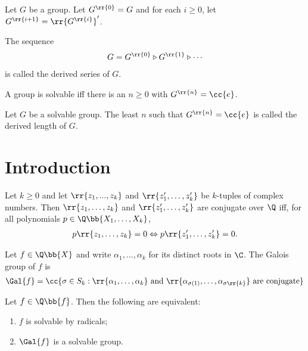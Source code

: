 \documentclass{article}
\begin{document}
\begin{definition}
  Let $G$ be a group. Let $G^{\rr{0}}=G$ and for each $i\geq 0$, let $G^{\rr{i+1}}=\rr{G^{\rr{i}}}'$.

  The sequence
  \begin{align*}
    G = G^{\rr{0}}\triangleright G^{\rr{1}}\triangleright \cdots
  \end{align*}
  is called the derived series of $G$.
\end{definition}

\begin{theorem}
  A group is solvable iff there is an $n\geq 0$ with $G^{\rr{n}}=\cc{e}$.
\end{theorem}

\begin{definition}
  Let $G$ be a solvable group. The least $n$ such that $G^{\rr{n}}=\cc{e}$ is called the
  derived length of $G$.
\end{definition}

\section{Introduction}\label{sec:introduction}

\begin{definition}
  Let $k\geq 0$ and let $\rr{z_1,...,z_k}$ and $\rr{z'_1,\ldots,z'_k}$ be $k$-tuples
  of complex numbers. Then $\rr{z_1,\ldots,z_k}$ and $\rr{z'_1,\ldots,z'_k}$ are conjugate
  over $\Q$ iff, for all polynomials $p\in\Q\bb{X_1,\ldots,X_k}$,
  \begin{align*}
    p\rr{z_1,\ldots,z_k}=0 \Leftrightarrow p\rr{z'_1,\ldots,z'_k}=0.
  \end{align*}
\end{definition}

\begin{definition}
  Let $f\in\Q\bb{X}$ and write $\alpha_1,...,\alpha_k$ for its distinct roots in $\C$.
  The Galois group of $f$ is
  \begin{align*}
    \Gal{f}=\cc{\sigma\in S_k:\rr{\alpha_1,\ldots,\alpha_k}\text{ and }\rr{\alpha_{\sigma(1)},\ldots,\alpha_{\sigma\rr{k}}}\text{ are conjugate}}
  \end{align*}
\end{definition}

\begin{theorem}[Galois]
  Let $f\in\Q\bb{f}$. Then the following are equivalent:
  \begin{enumerate}
    \item $f$ is solvable by radicals;
    \item $\Gal{f}$ is a solvable group.
  \end{enumerate}
\end{theorem}
\end{document}
